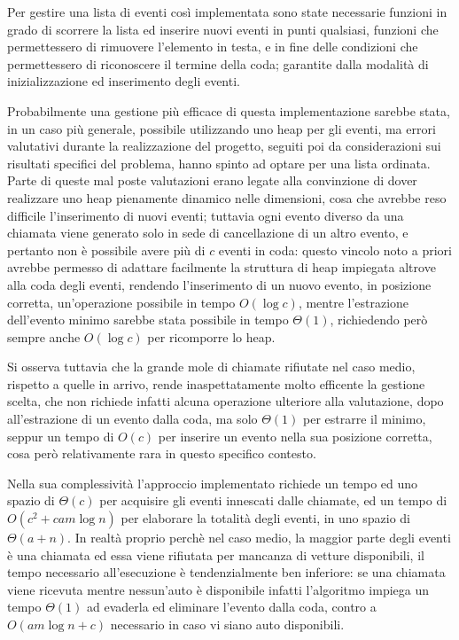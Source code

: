 \documentclass[a4paper,11pt]{Article}
\begin{document}
Per gestire una lista di eventi così implementata sono state necessarie funzioni in grado di scorrere la lista ed inserire nuovi eventi in punti qualsiasi, funzioni che permettessero di rimuovere l'elemento in testa, e in fine delle condizioni che permettessero di riconoscere il termine della coda; garantite dalla modalità di inizializzazione ed inserimento degli eventi.

Probabilmente una gestione più efficace di questa implementazione sarebbe stata, in un caso più generale, possibile utilizzando uno heap per gli eventi, ma errori valutativi durante la realizzazione del progetto, seguiti poi da considerazioni sui risultati specifici del problema, hanno spinto ad optare per una lista ordinata. Parte di queste mal poste valutazioni erano legate alla convinzione di dover realizzare uno heap pienamente dinamico nelle dimensioni, cosa che avrebbe reso difficile l'inserimento di nuovi eventi; tuttavia ogni evento diverso da una chiamata viene generato solo in sede di cancellazione di un altro evento, e pertanto non è possibile avere più di $c$ eventi in coda: questo vincolo noto a priori avrebbe permesso di adattare facilmente la struttura di heap impiegata altrove alla coda degli eventi, rendendo l'inserimento di un nuovo evento, in posizione corretta, un'operazione possibile in tempo $O(\log{c})$, mentre l'estrazione dell'evento minimo sarebbe stata possibile in tempo $\Theta(1)$, richiedendo però sempre anche $O(\log{c})$ per ricomporre lo heap.

Si osserva tuttavia che la grande mole di chiamate rifiutate nel caso medio, rispetto a quelle in arrivo, rende inaspettatamente molto efficente la gestione scelta, che non richiede infatti alcuna operazione ulteriore alla valutazione, dopo all'estrazione di un evento dalla coda, ma solo $\Theta(1)$ per estrarre il minimo, seppur un tempo di $O(c)$ per inserire un evento nella sua posizione corretta, cosa però relativamente rara in questo specifico contesto.

Nella sua complessività l'approccio implementato richiede un tempo ed uno spazio di $\Theta(c)$ per acquisire gli eventi innescati dalle chiamate, ed un tempo di  $O(c^2 + cam\log{n})$ per elaborare la totalità degli eventi, in uno spazio di  $\Theta(a + n)$.
In realtà proprio perchè nel caso medio, la maggior parte degli eventi è una chiamata ed essa viene rifiutata per mancanza di vetture disponibili, il tempo necessario all'esecuzione è tendenzialmente ben inferiore: se una chiamata viene ricevuta mentre nessun'auto è disponibile infatti l'algoritmo impiega un tempo $\Theta(1)$ ad evaderla ed eliminare l'evento dalla coda, contro a $O(am\log{n} + c)$ necessario in caso vi siano auto disponibili.
\end{document}
